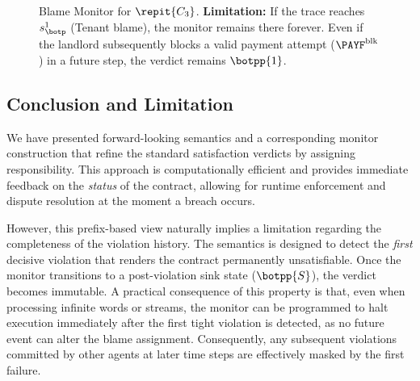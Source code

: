 \begin{example}
\begin{figure}[h!]
          \caption{Blame Monitor for $\repit{C_3}$.
          \textbf{Limitation:} If the trace reaches $s_{\botp}^1$ (Tenant blame), the monitor remains there forever. Even if the landlord subsequently blocks a valid payment attempt ($\PAYF^{\text{blk}}$) in a future step, the verdict remains $\botpp{1}$.}
          \label{fig:rep-c3_blame}
          \end{figure}
          \end{example}     
          
\subsection{Conclusion and Limitation}      
          We have presented forward-looking semantics and a corresponding monitor construction that refine the standard satisfaction verdicts by assigning responsibility. 
          This approach is computationally efficient and provides immediate feedback on the \emph{status} of the contract, allowing for runtime enforcement and dispute resolution at the moment a breach occurs.
          
          However, this prefix-based view naturally implies a limitation regarding the completeness of the violation history. 
          The semantics is designed to detect the \emph{first} decisive violation that renders the contract permanently unsatisfiable. 
          Once the monitor transitions to a post-violation sink state ($\botpp{S}$), the verdict becomes immutable. 
          A practical consequence of this property is that, even when processing infinite words or streams, the monitor can be programmed to halt execution immediately after the first tight violation is detected, as no future event can alter the blame assignment.
          Consequently, any subsequent violations committed by other agents at later time steps are effectively masked by the first failure.
          
